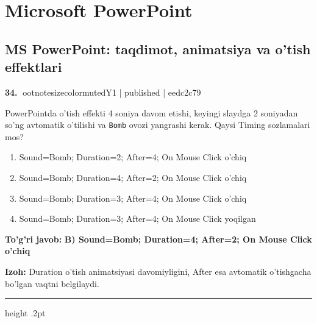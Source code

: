 \documentclass[10pt,a4paper]{article}
\begin{document}
\section{Microsoft PowerPoint}
\subsection{MS PowerPoint: taqdimot, animatsiya va o'tish effektlari}

\textbf{\color{ink}34.} {ootnotesizecolor{muted}Y1 | published | eedc2c79}
\par
PowerPointda o'tish effekti 4 soniya davom etishi, keyingi slaydga 2 soniyadan so'ng avtomatik o'tilishi va \texttt{Bomb} ovozi yangrashi kerak. Qaysi Timing sozlamalari mos?
\begin{enumerate}[label=\Alph*),leftmargin=9mm]
\item Sound=Bomb; Duration=2; After=4; On Mouse Click o'chiq
\item Sound=Bomb; Duration=4; After=2; On Mouse Click o'chiq
\item Sound=Bomb; Duration=3; After=4; On Mouse Click o'chiq
\item Sound=Bomb; Duration=3; After=4; On Mouse Click yoqilgan
\end{enumerate}
\begin{tcolorbox}[enhanced,breakable,colback=teal!4,colframe=teal!55!black,boxrule=0.45pt,arc=1.2mm,left=2.8mm,right=2.8mm,top=2mm,bottom=2mm]
\textbf{\color{teal}To'g'ri javob:} \textbf{B) Sound=Bomb; Duration=4; After=2; On Mouse Click o'chiq}
\par\smallskip
\textbf{Izoh:} Duration o'tish animatsiyasi davomiyligini, After esa avtomatik o'tishgacha bo'lgan vaqtni belgilaydi.
\end{tcolorbox}
\vspace{2mm}\hrule height .2pt\vspace{2mm}
\end{document}
